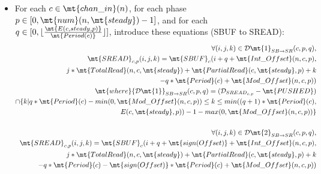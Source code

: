 \begin{itemize}
%
\item For each $c \in \mt{chan\_in}(n)$, for each phase $p \in [0,
\mt{num}(n, \mt{steady})-1]$, and for each $q \in [0, \lfloor
\frac{\mt{E(c, steady, p)}}{\mt{Period(c)}} \rfloor]$, introduce
these equations (SBUF to SREAD):
\begin{align*}
\forall (i,j,k) \in {{\cal D}\mt{1}}_{SB {\small \rightarrow} SR}(c,p,q), \\
\mt{SREAD}_{c, p}(i,j,k) = 
    \mt{SBUF}_{c}(i+q+
                  \mt{Int\_Offset}(n,c,p), \\
                  j*\mt{TotalRead}(n,c,\mt{steady}) + 
                    \mt{PartialRead}(c,\mt{steady},p) + k \\
                   - q * \mt{Period}(c) + \mt{Mod\_Offset}(n,c,p)) \\
\mt{where }{{\cal D}\mt{1}}_{SB {\small \rightarrow} SR}(c,p,q) = 
  ({\cal D}_{{SREAD}_{c, p}} - \mt{PUSHED}) \\
                         \cap \{ k | q * \mt{Period}(c) - min(0, \mt{Mod\_Offset}(n,c,p))
                                \le k 
                                \le min((q+1)*\mt{Period}(c),  \\
                                        E(c, \mt{steady}, p)) - 1 
                                        - max(0, \mt{Mod\_Offset}(n,c,p)) \} \\ ~ \\
%
%
\forall (i,j,k) \in {{\cal D}\mt{2}}_{SB {\small \rightarrow} SR}(c,p,q), \\
\mt{SREAD}_{c, p}(i,j,k) = 
    \mt{SBUF}_{c}(i+q+
                  \mt{sign(Offset)} + \mt{Int\_Offset}(n,c,p), \\
                  j*\mt{TotalRead}(n,c,\mt{steady}) + 
                    \mt{PartialRead}(c,\mt{steady},p) + k  \\
                   - q * \mt{Period}(c) 
                   - \mt{sign(Offset)} * \mt{Period}(c) + \mt{Mod\_Offset}(n,c,p)) \\

\end{align*}
\end{itemize}
